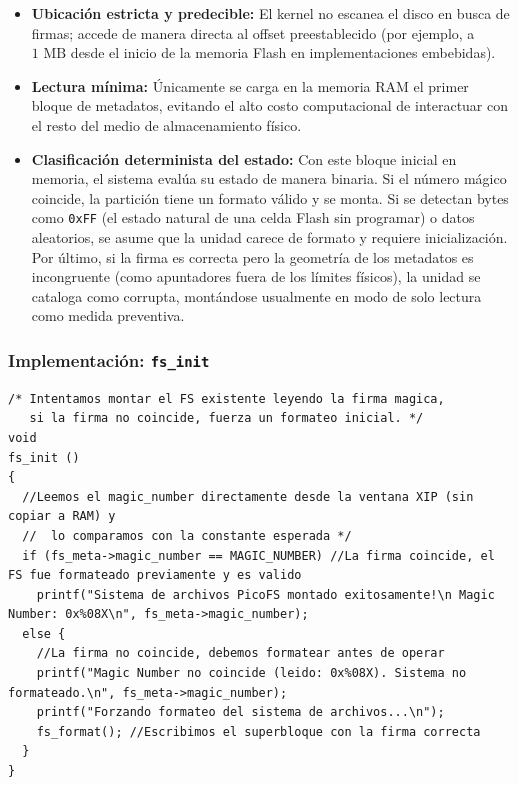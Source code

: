 \documentclass[12pt,letterpaper]{article}
\begin{document}
\begin{itemize}
\item \textbf{Ubicación estricta y predecible:} El kernel no escanea el disco en busca de firmas; accede de
  manera directa al offset preestablecido (por ejemplo, a $1\text{ MB}$ desde el inicio de la memoria Flash en
  implementaciones embebidas).
\item \textbf{Lectura mínima:} Únicamente se carga en la memoria RAM el primer bloque de metadatos, evitando el
  alto costo computacional de interactuar con el resto del medio de almacenamiento físico.
\item \textbf{Clasificación determinista del estado:} Con este bloque inicial en memoria, el sistema evalúa su
  estado de manera binaria. Si el número mágico coincide, la partición tiene un formato válido y se monta. Si se
  detectan bytes como \texttt{0xFF} (el estado natural de una celda Flash sin programar) o datos aleatorios, se
  asume que la unidad carece de formato y requiere inicialización. Por último, si la firma es correcta pero la
  geometría de los metadatos es incongruente (como apuntadores fuera de los límites físicos), la unidad se
  cataloga como corrupta, montándose usualmente en modo de solo lectura como medida preventiva.
\end{itemize}

\subsubsection*{Implementación: \texttt{fs\_init}}

\begin{lstlisting}[style=modernc, caption={Módulo 1: montaje o formateo inicial del sistema de archivos}]
/* Intentamos montar el FS existente leyendo la firma magica,
   si la firma no coincide, fuerza un formateo inicial. */
void
fs_init ()
{
  //Leemos el magic_number directamente desde la ventana XIP (sin copiar a RAM) y
  //  lo comparamos con la constante esperada */
  if (fs_meta->magic_number == MAGIC_NUMBER) //La firma coincide, el FS fue formateado previamente y es valido
    printf("Sistema de archivos PicoFS montado exitosamente!\n Magic Number: 0x%08X\n", fs_meta->magic_number);
  else {
    //La firma no coincide, debemos formatear antes de operar
    printf("Magic Number no coincide (leido: 0x%08X). Sistema no formateado.\n", fs_meta->magic_number);
    printf("Forzando formateo del sistema de archivos...\n");
    fs_format(); //Escribimos el superbloque con la firma correcta
  }
}
\end{lstlisting}
\end{document}
